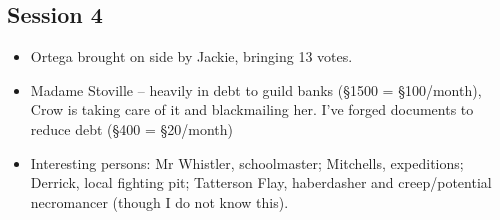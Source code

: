 \documentclass[10pt,a4paper]{article}
\begin{document}
\begin{minipage}[t]{\textwidth}
\subsection*{Session 4}
  
  \begin{itemize}
    \item Ortega brought on side by Jackie, bringing 13 votes.
    \item Madame Stoville -- heavily in debt to guild banks (§1500 = §100/month), Crow is taking care of it and blackmailing her. I've forged documents to reduce debt (§400 = §20/month)
    \item Interesting persons: Mr Whistler, schoolmaster; Mitchells, expeditions; Derrick, local fighting pit; Tatterson Flay, haberdasher and creep/potential necromancer (though I do not know this).
  \end{itemize}

\end{minipage}

\newpage
\end{document}
